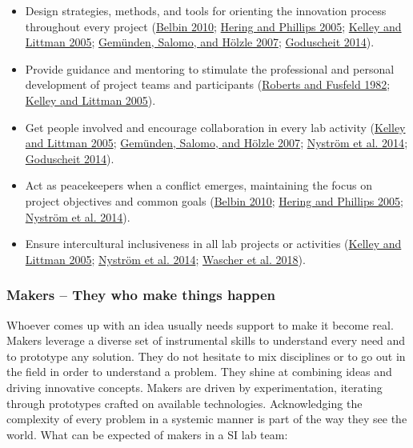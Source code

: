 \documentclass[AMA,STIX1COL,APA,STIX2COL]{WileyNJD-v2}
\providecommand{\tightlist}{%
  \setlength{\itemsep}{0pt}\setlength{\parskip}{0pt}}
\begin{document}
\begin{itemize}
\tightlist
\item
  Design strategies, methods, and tools for orienting the innovation
  process throughout every project
  (\protect\hyperlink{ref-Belbin2010}{Belbin 2010};
  \protect\hyperlink{ref-Hering2005}{Hering and Phillips 2005};
  \protect\hyperlink{ref-Kelley2005}{Kelley and Littman 2005};
  \protect\hyperlink{ref-Gemunden2007}{Gemünden, Salomo, and Hölzle
  2007}; \protect\hyperlink{ref-Goduscheit2014}{Goduscheit 2014}).
\item
  Provide guidance and mentoring to stimulate the professional and
  personal development of project teams and participants
  (\protect\hyperlink{ref-Roberts1982}{Roberts and Fusfeld 1982};
  \protect\hyperlink{ref-Kelley2005}{Kelley and Littman 2005}).
\item
  Get people involved and encourage collaboration in every lab activity
  (\protect\hyperlink{ref-Kelley2005}{Kelley and Littman 2005};
  \protect\hyperlink{ref-Gemunden2007}{Gemünden, Salomo, and Hölzle
  2007}; \protect\hyperlink{ref-Nystrom2014}{Nyström et al. 2014};
  \protect\hyperlink{ref-Goduscheit2014}{Goduscheit 2014}).
\item
  Act as peacekeepers when a conflict emerges, maintaining the focus on
  project objectives and common goals
  (\protect\hyperlink{ref-Belbin2010}{Belbin 2010};
  \protect\hyperlink{ref-Hering2005}{Hering and Phillips 2005};
  \protect\hyperlink{ref-Nystrom2014}{Nyström et al. 2014}).
\item
  Ensure intercultural inclusiveness in all lab projects or activities
  (\protect\hyperlink{ref-Kelley2005}{Kelley and Littman 2005};
  \protect\hyperlink{ref-Nystrom2014}{Nyström et al. 2014};
  \protect\hyperlink{ref-Wascher2018}{Wascher et al. 2018}).
\end{itemize}

\hypertarget{makers-they-who-make-things-happen}{%
\subsubsection{Makers -- They who make things
happen}\label{makers-they-who-make-things-happen}}

Whoever comes up with an idea usually needs support to make it become
real. Makers leverage a diverse set of instrumental skills to understand
every need and to prototype any solution. They do not hesitate to mix
disciplines or to go out in the field in order to understand a problem.
They shine at combining ideas and driving innovative concepts. Makers
are driven by experimentation, iterating through prototypes crafted on
available technologies. Acknowledging the complexity of every problem in
a systemic manner is part of the way they see the world. What can be
expected of makers in a SI lab team:
\end{document}
